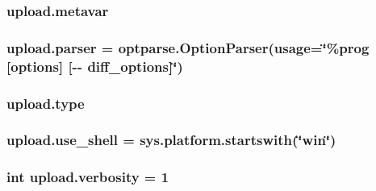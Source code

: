 \subsubsection[{\texorpdfstring{metavar}{metavar}}]{\setlength{\rightskip}{0pt plus 5cm}upload.\+metavar}\hypertarget{namespaceupload_af1cea8af5389f0ab2d8b65b2c0fd2fe0}{}\label{namespaceupload_af1cea8af5389f0ab2d8b65b2c0fd2fe0}
\subsubsection[{\texorpdfstring{parser}{parser}}]{\setlength{\rightskip}{0pt plus 5cm}upload.\+parser = optparse.\+Option\+Parser(usage=\char`\"{}\%prog \mbox{[}options\mbox{]} \mbox{[}-\/-\/ diff\+\_\+options\mbox{]}\char`\"{})}\hypertarget{namespaceupload_af9e508d19dc2dd9cdb7c642dde0bdd21}{}\label{namespaceupload_af9e508d19dc2dd9cdb7c642dde0bdd21}
\subsubsection[{\texorpdfstring{type}{type}}]{\setlength{\rightskip}{0pt plus 5cm}upload.\+type}\hypertarget{namespaceupload_a4fc56f0dd6613be15c3c4dc3af3619ce}{}\label{namespaceupload_a4fc56f0dd6613be15c3c4dc3af3619ce}
\subsubsection[{\texorpdfstring{use\+\_\+shell}{use_shell}}]{\setlength{\rightskip}{0pt plus 5cm}upload.\+use\+\_\+shell = sys.\+platform.\+startswith(\char`\"{}win\char`\"{})}\hypertarget{namespaceupload_afa85ceef00a65cd276a856404eb5f310}{}\label{namespaceupload_afa85ceef00a65cd276a856404eb5f310}
\subsubsection[{\texorpdfstring{verbosity}{verbosity}}]{\setlength{\rightskip}{0pt plus 5cm}int upload.\+verbosity = 1}\hypertarget{namespaceupload_a79aff46409a98c4e5f608c8df1fd4612}{}\label{namespaceupload_a79aff46409a98c4e5f608c8df1fd4612}
